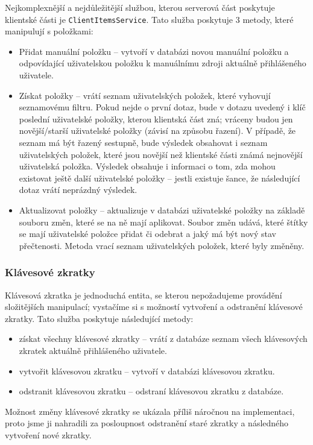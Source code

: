 Nejkomplexnější a nejdůležitější službou, kterou serverová část poskytuje klientské části je \verb|ClientItemsService|.
Tato služba poskytuje 3 metody, které manipulují s položkami:
\begin{itemize}
	\item Přidat manuální položku -- vytvoří v databázi novou manuální položku a odpovídající uživatelskou položku k manuálnímu zdroji aktuálně přihlášeného uživatele.
	\item Získat položky -- vrátí seznam uživatelských položek, které vyhovují seznamovému filtru.
		Pokud nejde o první dotaz, bude v dotazu uvedený i klíč poslední uživatelské položky, kterou klientská část zná; vráceny budou jen novější/starší uživatelské položky (závisí na způsobu řazení).
		V případě, že seznam má být řazený sestupně, bude výsledek obsahovat i seznam uživatelských položek, které jsou novější než klientské části známá nejnovější uživatelská položka.
		Výsledek obsahuje i informaci o tom, zda mohou existovat ještě další uživatelské položky -- jestli existuje šance, že následující dotaz vrátí neprázdný výsledek.
	\item Aktualizovat položky -- aktualizuje v databázi uživatelské položky na základě souboru změn, které se na ně mají aplikovat.
		Soubor změn udává, které štítky se mají uživatelské položce přidat či odebrat a jaký má být nový stav přečtenosti.
		Metoda vrací seznam uživatelských položek, které byly změněny.
\end{itemize}

\subsubsection{Klávesové zkratky}

Klávesová zkratka je jednoduchá entita, se kterou nepožadujeme provádění složitějších manipulací; vystačíme si s možností vytvoření a odstranění klávesové zkratky.
Tato služba poskytuje následující metody:
\begin{itemize}
	\item získat všechny klávesové zkratky -- vrátí z databáze seznam všech klávesových zkratek aktuálně přihlášeného uživatele.
	\item vytvořit klávesovou zkratku -- vytvoří v databázi klávesovou zkratku.
	\item odstranit klávesovou zkratku -- odstraní klávesovou zkratku z databáze.
\end{itemize}

Možnost změny klávesové zkratky se ukázala příliš náročnou na implementaci, proto jsme ji nahradili za posloupnost odstranění staré zkratky a následného vytvoření nové zkratky.

